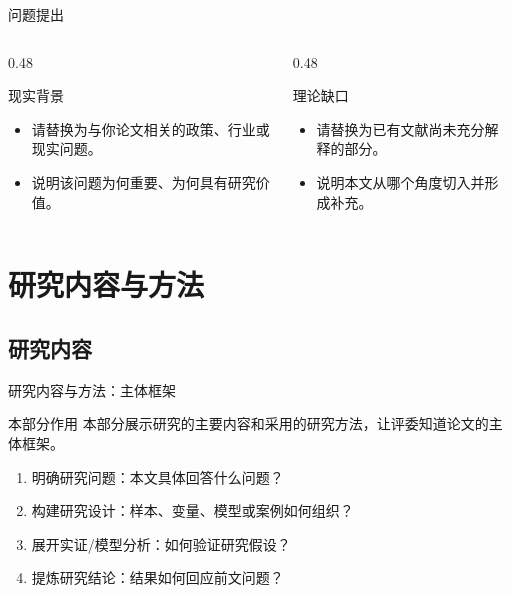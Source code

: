 \documentclass{beamer}
\begin{document}
\begin{frame}{问题提出}
    \begin{columns}
        \begin{column}{0.48\textwidth}
            \begin{exampleblock}{现实背景}
                \begin{itemize}
                    \item 请替换为与你论文相关的政策、行业或现实问题。
                    \item 说明该问题为何重要、为何具有研究价值。
                \end{itemize}
            \end{exampleblock}
        \end{column}
        \begin{column}{0.48\textwidth}
            \begin{exampleblock}{理论缺口}
                \begin{itemize}
                    \item 请替换为已有文献尚未充分解释的部分。
                    \item 说明本文从哪个角度切入并形成补充。
                \end{itemize}
            \end{exampleblock}
        \end{column}
    \end{columns}
\end{frame}


\section{研究内容与方法}

\subsection{研究内容}

\begin{frame}{研究内容与方法：主体框架}
    \begin{block}{本部分作用}
        本部分展示研究的主要内容和采用的研究方法，让评委知道论文的主体框架。
    \end{block}
    \begin{enumerate}
        \item 明确研究问题：本文具体回答什么问题？
        \item 构建研究设计：样本、变量、模型或案例如何组织？
        \item 展开实证/模型分析：如何验证研究假设？
        \item 提炼研究结论：结果如何回应前文问题？
    \end{enumerate}
\end{frame}
\end{document}
